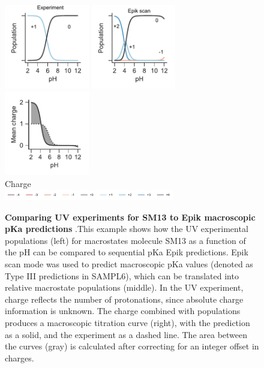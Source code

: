 \documentclass[9pt,lineno,final]{elife}
\begin{document}
\begin{figure}[H]
	\centering
	\includegraphics[width=0.33\textwidth]{Reports/Experiment-populations-SM13-titled.pdf}
	\includegraphics[width=0.33\textwidth]{Reports/Epik-scan-populations-SM13-titled.pdf}
	\includegraphics[width=0.33\textwidth]{Reports/Epik-scan-virtual-titration-SM13.pdf}\\
	Charge \\
	\includegraphics[width=0.66\textwidth, trim={2cm 0 2cm 0},clip]{Reports/overview-charge-legend-SM03.pdf}
		\caption{{\bf Comparing UV experiments for SM13 to Epik macroscopic pKa predictions} .This example shows how the UV experimental populations (left) for macrostates molecule SM13 as a function of the pH can be compared to sequential pKa Epik predictions. Epik scan mode was used to predict macroscopic pKa values (denoted as Type III predictions in SAMPL6), which can be translated into relative macrostate populations (middle). In the UV experiment, charge reflects the number of protonations, since absolute charge information is unknown. The charge combined with populations produces a macroscopic titration curve (right), with the prediction as a solid, and the experiment as a dashed line. The area between the curves (gray) is calculated after correcting for an integer offset in charges.    
	\label{fig:epikiii-prediction}}
\end{figure}
\end{document}
